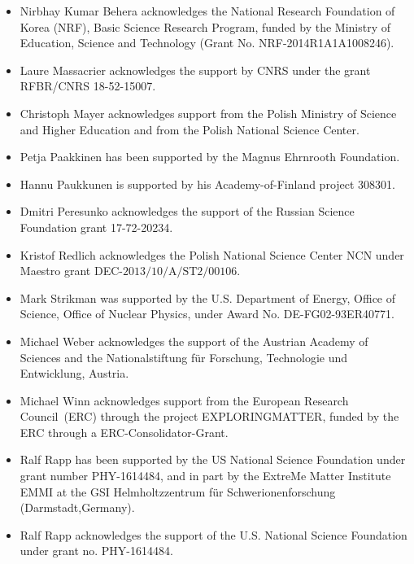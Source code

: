 \begin{itemize}
\item Nirbhay Kumar Behera acknowledges the National Research Foundation of Korea (NRF), Basic Science Research Program, funded by the Ministry of Education, Science and Technology (Grant No. NRF-2014R1A1A1008246). %
\item Laure Massacrier acknowledges the support by CNRS under the grant RFBR/CNRS 18-52-15007.%
\item Christoph Mayer acknowledges support from the Polish Ministry of Science and Higher Education and from the Polish National Science Center.%
\item Petja Paakkinen has been supported by the Magnus Ehrnrooth Foundation.%
\item Hannu Paukkunen is supported by his Academy-of-Finland project 308301.%
\item Dmitri Peresunko acknowledges the support of the Russian Science Foundation grant 17-72-20234.%
\item Kristof Redlich acknowledges the Polish National Science Center NCN under Maestro grant DEC-$\mathrm{2013/10/A/ST2/00106}$.  %
\item Mark Strikman was supported by the U.S. Department of Energy, Office of Science, Office of Nuclear Physics, under Award No. DE-FG02-93ER40771.%
\item Michael Weber acknowledges the support of the Austrian Academy of Sciences and the Nationalstiftung f\"ur Forschung, Technologie und Entwicklung, Austria.%
\item Michael Winn acknowledges support from the European Research Council~(ERC) through the project EXPLORINGMATTER, funded by the ERC through a ERC-Consolidator-Grant.%


\item Ralf Rapp has been supported by the US National Science Foundation under grant number PHY-1614484, and in part by the ExtreMe Matter Institute EMMI at the GSI Helmholtzzentrum f\"{u}r Schwerionenforschung (Darmstadt,Germany).%
\item Ralf Rapp acknowledges the support of the U.S. National Science Foundation under grant no. PHY-1614484.%












\end{itemize}

